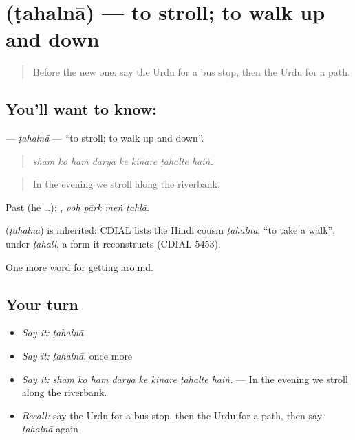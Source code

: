 \section[\texorpdfstring{\ur{ٹہلنا} (ṭahalnā)}{ٹہلنا (ṭahalnā)}]{ (ṭahalnā) — to stroll; to walk up and down}

\label{lesson:UR-C392-tahalna}



\begin{quote}
Before the new one: say the Urdu for a bus stop, then the Urdu for a path.
\end{quote}

\subsection*{You'll want to know: }
\textbf{} — \emph{ṭahalnā} — \textquotedblleft{}to stroll; to walk up and down\textquotedblright{}.

\begin{quote}
       
\end{quote}

\begin{quote}
\emph{shām ko ham daryā ke kināre ṭahalte haiṅ.}
\end{quote}

\begin{quote}
In the evening we stroll along the riverbank.
\end{quote}

Past (he …):    , \emph{voh pārk meṅ ṭahlā}.

\begin{cousinweb}
\textbf{} (\emph{ṭahalnā}) is inherited: CDIAL lists the Hindi cousin \emph{ṭahalnā}, \textquotedblleft{}to take a walk\textquotedblright{}, under \emph{ṭahall}, a form it reconstructs (CDIAL 5453).
\end{cousinweb}

\begin{grammarlens}[title={What you've built}]
One more word for getting around.
\end{grammarlens}

\subsection*{Your turn}
\begin{itemize}
\raggedright
  \item \emph{Say it:} \emph{ṭahalnā}
  \item \emph{Say it:} \emph{ṭahalnā}, once more
  \item \emph{Say it:} \emph{shām ko ham daryā ke kināre ṭahalte haiṅ.} — In the evening we stroll along the riverbank.
  \item \emph{Recall:} say the Urdu for a bus stop, then the Urdu for a path, then say \emph{ṭahalnā} again
\end{itemize}

